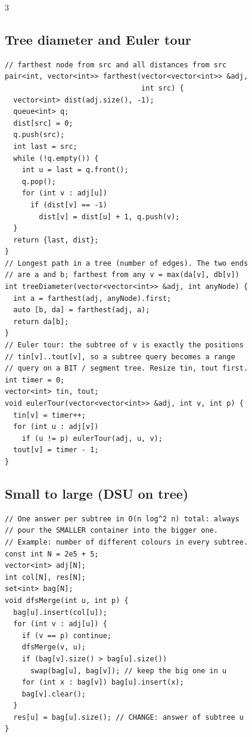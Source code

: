 \documentclass[8pt, a4paper]{article}
\begin{document}
\begin{multicols*}{3}
\subsection{Tree diameter and Euler tour}
\begin{lstlisting}
// farthest node from src and all distances from src
pair<int, vector<int>> farthest(vector<vector<int>> &adj,
                                int src) {
  vector<int> dist(adj.size(), -1);
  queue<int> q;
  dist[src] = 0;
  q.push(src);
  int last = src;
  while (!q.empty()) {
    int u = last = q.front();
    q.pop();
    for (int v : adj[u])
      if (dist[v] == -1)
        dist[v] = dist[u] + 1, q.push(v);
  }
  return {last, dist};
}
// Longest path in a tree (number of edges). The two ends
// are a and b; farthest from any v = max(da[v], db[v])
int treeDiameter(vector<vector<int>> &adj, int anyNode) {
  int a = farthest(adj, anyNode).first;
  auto [b, da] = farthest(adj, a);
  return da[b];
}
// Euler tour: the subtree of v is exactly the positions
// tin[v]..tout[v], so a subtree query becomes a range
// query on a BIT / segment tree. Resize tin, tout first.
int timer = 0;
vector<int> tin, tout;
void eulerTour(vector<vector<int>> &adj, int v, int p) {
  tin[v] = timer++;
  for (int u : adj[v])
    if (u != p) eulerTour(adj, u, v);
  tout[v] = timer - 1;
}
\end{lstlisting}
\subsection{Small to large (DSU on tree)}
\begin{lstlisting}
// One answer per subtree in O(n log^2 n) total: always
// pour the SMALLER container into the bigger one.
// Example: number of different colours in every subtree.
const int N = 2e5 + 5;
vector<int> adj[N];
int col[N], res[N];
set<int> bag[N];
void dfsMerge(int u, int p) {
  bag[u].insert(col[u]);
  for (int v : adj[u]) {
    if (v == p) continue;
    dfsMerge(v, u);
    if (bag[v].size() > bag[u].size())
      swap(bag[u], bag[v]); // keep the big one in u
    for (int x : bag[v]) bag[u].insert(x);
    bag[v].clear();
  }
  res[u] = bag[u].size(); // CHANGE: answer of subtree u
}
\end{lstlisting}

\end{multicols*}
\end{document}
